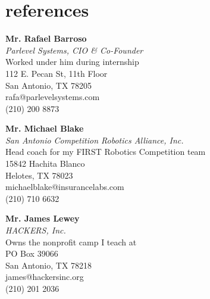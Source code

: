 
%
\section{references}
		
\textbf{Mr. Rafael Barroso} \\
\textit{Parlevel Systems, CIO \& Co-Founder} \\
Worked under him during internship \\
112 E. Pecan St, 11th Floor \\
San Antonio, TX 78205 \\
rafa@parlevelsystems.com \\
(210) 200 8873

\vspace{40pt}
\textbf{Mr. Michael Blake} \\
\textit{San Antonio Competition Robotics Alliance, Inc.} \\
Head coach for my FIRST Robotics Competition team \\
15842 Hachita Blanco \\
Helotes, TX 78023 \\
michaelblake@insurancelabs.com \\
(210) 710 6632

\vspace{40pt}
\textbf{Mr. James Lewey} \\
\textit{HACKERS, Inc.} \\
Owns the nonprofit camp I teach at \\
PO Box 39066 \\
San Antonio, TX 78218 \\
james@hackersinc.org \\
(210) 201 2036


		
%